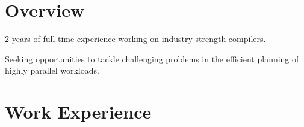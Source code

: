 \documentclass{moderncv}
\begin{document}
\makecvtitle
\begin{comment}
\section{Skills}
\begin{minipage}{0.25\textwidth}
    \begin{itemize}
        \item Reinforcement Learning
    \end{itemize}
\end{minipage}
    \begin{minipage}{0.25\textwidth}
    \begin{itemize}
        \item Reinforcement Learning
    \end{itemize}
\end{minipage}
\begin{minipage}{0.25\textwidth}
    \begin{itemize}
        \item Reinforcement Learning
    \end{itemize}
\end{minipage}
\begin{minipage}{0.25\textwidth}
    \begin{itemize}
        \item Reinforcement Learning
    \end{itemize}
\end{minipage}
\end{comment}
\section{Overview}
2 years of full-time experience working on industry-strength compilers.

Seeking opportunities to tackle challenging problems in the efficient planning of highly parallel workloads.

\section{Work Experience}
\end{document}
